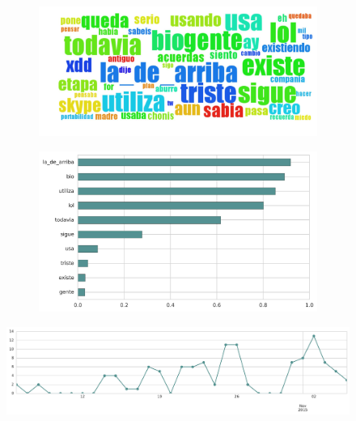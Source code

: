 \begin{figure}[htbp!]
    \centering
    \begin{subfigure}[b]{0.49\textwidth}
        \includegraphics[width=\textwidth]{twitter_all/report_images/topic-15-wordcloud.jpg}
    \end{subfigure}
    \begin{subfigure}[b]{0.49\textwidth}
        \includegraphics[width=\textwidth]{twitter_all/report_images/topic-15-terms.jpg}
    \end{subfigure}
\end{figure}

\begin{figure}[htbp!]
    \centering
    \includegraphics[width=\textwidth]{twitter_all/report_images/topic-15-timeseries.jpg}
\end{figure}

